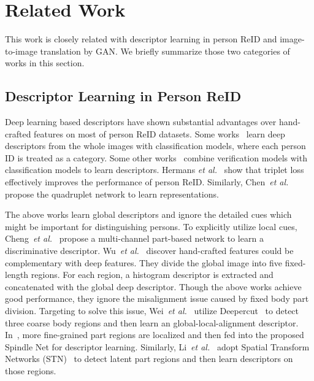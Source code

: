 \documentclass[10pt,twocolumn,letterpaper]{article}
\begin{document}
\section{Related Work} \label{sec:relatedwork}
This work is closely related with descriptor learning in person ReID and image-to-image translation by GAN. We briefly summarize those two categories of works in this section.

\subsection{Descriptor Learning in Person ReID}
Deep learning based descriptors have shown substantial advantages over hand-crafted features on most of person ReID datasets. Some works~\cite{xiao2016learning,zheng2017unlabeled} learn deep descriptors from the whole images with classification models, where each person ID is treated as a category. Some other works~\cite{zheng2016discriminatively,geng2016deep} combine verification models with classification models to learn descriptors. Hermans \emph{et al.}~\cite{hermans2017defense} show that triplet loss effectively improves the performance of person ReID. Similarly, Chen~\emph{et al.}~\cite{chen2017beyond} propose the quadruplet network to learn representations.

The above works learn global descriptors and ignore the detailed cues which might be important for distinguishing persons. To explicitly utilize local cues, Cheng~\emph{et al.}~\cite{cheng2016person} propose a multi-channel part-based network to learn a discriminative descriptor. Wu~\emph{et al.}~\cite{wu2016enhanced} discover hand-crafted features could be complementary with deep features. They divide the global image into five fixed-length regions. For each region, a histogram descriptor is extracted and concatenated with the global deep descriptor. Though the above works achieve good performance, they ignore the misalignment issue caused by fixed body part division. Targeting to solve this issue, Wei~\emph{et al.}~\cite{wei2017glad} utilize Deepercut~\cite{insafutdinov2016deepercut} to detect three coarse body regions and then learn an global-local-alignment descriptor. In~\cite{zhao2017spindle}, more fine-grained part regions are localized and then fed into the proposed Spindle Net for descriptor learning. Similarly, Li~\emph{et al.}~\cite{li2017learning} adopt Spatial Transform Networks (STN)~\cite{jaderberg2015spatial} to detect latent part regions and then learn descriptors on those regions.
\end{document}
